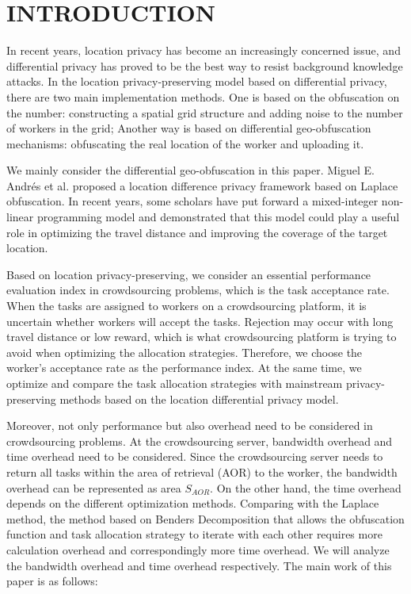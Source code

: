 \section{INTRODUCTION} %
In recent years, location privacy has become an increasingly concerned issue, and differential privacy has proved to be the best way to resist background knowledge attacks. In the location privacy-preserving model based on differential privacy, there are two main implementation methods. One is based on the obfuscation on the number: constructing a spatial grid structure and adding noise to the number of workers in the grid; Another way is based on differential geo-obfuscation mechanisms: obfuscating the real location of the worker and uploading it.

We mainly consider the differential geo-obfuscation in this paper. Miguel E. Andrés et al. proposed a location difference privacy framework based on Laplace obfuscation. In recent years, some scholars have put forward a mixed-integer non-linear programming model and demonstrated that this model could play a useful role in optimizing the travel distance and improving the coverage of the target location.

Based on location privacy-preserving, we consider an essential performance evaluation index in crowdsourcing problems, which is the task acceptance rate. When the tasks are assigned to workers on a crowdsourcing platform, it is uncertain whether workers will accept the tasks. Rejection may occur with long travel distance or low reward, which is what crowdsourcing platform is trying to avoid when optimizing the allocation strategies. Therefore, we choose the worker's acceptance rate as the performance index. At the same time, we optimize and compare the task allocation strategies with mainstream privacy-preserving methods based on the location differential privacy model.

Moreover, not only performance but also overhead need to be considered in crowdsourcing problems. At the crowdsourcing server, bandwidth overhead and time overhead need to be considered. Since the crowdsourcing server needs to return all tasks within the area of retrieval (AOR) to the worker, the bandwidth overhead can be represented as area $S_{AOR}$. On the other hand, the time overhead depends on the different optimization methods. Comparing with the Laplace method, the method based on Benders Decomposition that allows the obfuscation function and task allocation strategy to iterate with each other requires more calculation overhead and correspondingly more time overhead. We will analyze the bandwidth overhead and time overhead respectively.
The main work of this paper is as follows:

